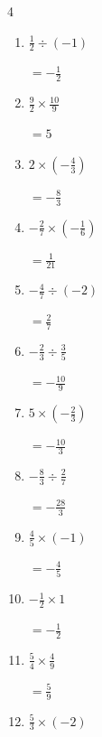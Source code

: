 \begin{multicols}{4}
\begin{enumerate}
        $\displaystyle =-\frac{1}{4}$

  \item $\displaystyle \frac{1}{2}\div{}\left(-1\right)$

        $\displaystyle =-\frac{1}{2}$

  \item $\displaystyle \frac{9}{2}\times{}\frac{10}{9}$

        $\displaystyle =5$

  \item $\displaystyle 2\times{}\left(-\frac{4}{3}\right)$

        $\displaystyle =-\frac{8}{3}$

  \item $\displaystyle -\frac{2}{7}\times{}\left(-\frac{1}{6}\right)$

        $\displaystyle =\frac{1}{21}$

  \item $\displaystyle -\frac{4}{7}\div{}\left(-2\right)$

        $\displaystyle =\frac{2}{7}$

  \item $\displaystyle -\frac{2}{3}\div{}\frac{3}{5}$

        $\displaystyle =-\frac{10}{9}$

  \item $\displaystyle 5\times{}\left(-\frac{2}{3}\right)$

        $\displaystyle =-\frac{10}{3}$

  \item $\displaystyle -\frac{8}{3}\div{}\frac{2}{7}$

        $\displaystyle =-\frac{28}{3}$

  \item $\displaystyle \frac{4}{5}\times{}\left(-1\right)$

        $\displaystyle =-\frac{4}{5}$

\columnbreak %

  \item $\displaystyle -\frac{1}{2}\times{}1$

        $\displaystyle =-\frac{1}{2}$

  \item $\displaystyle \frac{5}{4}\times{}\frac{4}{9}$

        $\displaystyle =\frac{5}{9}$

  \item $\displaystyle \frac{5}{3}\times{}\left(-2\right)$


\end{enumerate}
\end{multicols}
